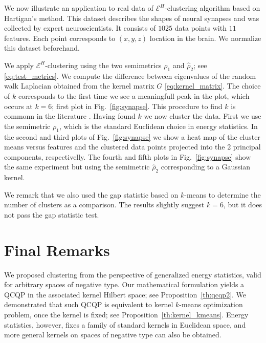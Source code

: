 \documentclass{article}
\begin{document}
We now illustrate an application to real data of 
$\mathcal{E}^H$-clustering algorithm based on Hartigan's method.
This dataset describes the shapes of neural synapses and was collected
by expert neuroscientists. It consists of $1025$ data points
with $11$ features. Each point
corresponds to $(x,y,z)$ location in the brain. We normalize this
dataset beforehand.

We apply $\mathcal{E}^H$-clustering using the two
semimetrics $\rho_1$ and $\widehat{\rho}_2$; see \eqref{eq:test_metrics}.
We compute the difference between eigenvalues of the random walk Laplacian
obtained from the kernel matrix $G$ \eqref{eq:kernel_matrix}.
The choice of $k$ corresponds to the first time we see a meaningfull
peak in the plot, which occurs at $k=6$; first plot in
Fig.~\ref{fig:synapse}.
This procedure to find $k$ is commonn in the literature \cite{vonLuxburg2007}.
Having found $k$ we now cluster the data.
First we use the semimetric $\rho_1$, which
is the standard Euclidean choice in energy statistics.
In the second and third plots of Fig.~\ref{fig:synapse} we show a heat
map of the cluster means versus features and the clustered data points
projected into the 2 principal components, respectivelly.
The fourth and fifth plots in Fig.~\ref{fig:synapse} show the same
experiment but using the semimetric $\widehat{\rho}_2$ corresponding
to a Gaussian kernel.

We remark that we also used the gap statistic \cite{Tibshirani2001} based
on $k$-means to determine the number of clusters as a comparison.
The results slightly suggest $k=6$, but it does not pass the gap
statistic test. 



\section{Final Remarks}
\label{sec:conclusion}

We proposed clustering from the perspective of generalized energy
statistics, valid for arbitrary spaces of negative type.
Our mathematical formulation yields
a QCQP in the associated kernel Hilbert space; 
see  Proposition~\ref{th:qcqp2}.
We demonstrated that such QCQP
is equivalent to kernel $k$-means optimization problem, 
once the kernel is fixed; see
Proposition~\ref{th:kernel_kmeans}. Energy statistics, however, fixes
a family of standard kernels in Euclidean space, and
more general kernels 
on spaces of negative type can also be obtained.
\end{document}
